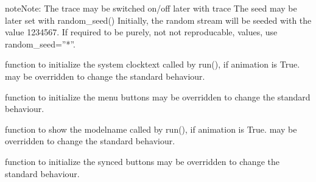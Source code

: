 \documentclass[letterpaper,10pt,english]{sphinxmanual}
\begin{document}
\begin{fulllineitems}
\begin{quote}
\begin{description}
\begin{itemize}
\end{itemize}

\end{description}\end{quote}

\begin{sphinxadmonition}{note}{Note:}
The trace may be switched on/off later with trace 
The seed may be later set with random\_seed() 
Initially, the random stream will be seeded with the value 1234567.
If required to be purely, not not reproducable, values, use
random\_seed=”*”.
\end{sphinxadmonition}

\begin{fulllineitems}
\label{\detokenize{Reference:salabim.Environment.an_clocktext}}
function to initialize the system clocktext 
called by run(), if animation is True. 
may be overridden to change the standard behaviour.

\end{fulllineitems}


\begin{fulllineitems}
\label{\detokenize{Reference:salabim.Environment.an_menu_buttons}}
function to initialize the menu buttons 
may be overridden to change the standard behaviour.

\end{fulllineitems}


\begin{fulllineitems}
\label{\detokenize{Reference:salabim.Environment.an_modelname}}
function to show the modelname 
called by run(), if animation is True. 
may be overridden to change the standard behaviour.

\end{fulllineitems}


\begin{fulllineitems}
\label{\detokenize{Reference:salabim.Environment.an_synced_buttons}}
function to initialize the synced buttons 
may be overridden to change the standard behaviour.


\end{fulllineitems}
\end{fulllineitems}
\end{document}
